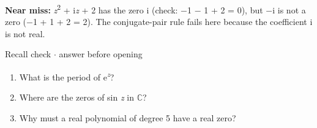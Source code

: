 \documentclass[11pt]{article}
\begin{document}
\begin{keepsection}
\begin{keepsection}
\begin{notebox}\textbf{Near miss:} \textit{z}\textsuperscript{2} + i\textit{z} + 2 has the zero i (check: \ensuremath{-}1 \ensuremath{-} 1 + 2 = 0), but \ensuremath{-}i is not a zero (\ensuremath{-}1 + 1 + 2 = 2). The conjugate-pair rule fails here because the coefficient i is not real.\end{notebox}

\begin{recallbox}{Recall check \ensuremath{\cdot} answer before opening}
\begin{enumerate}
\item What is the period of e\textsuperscript{\textit{z}}?
\item Where are the zeros of sin \textit{z} in \ensuremath{\mathbb{C}}?
\item Why must a real polynomial of degree 5 have a real zero?
\end{enumerate}

\end{recallbox}
\end{keepsection}
\end{keepsection}
\end{document}
